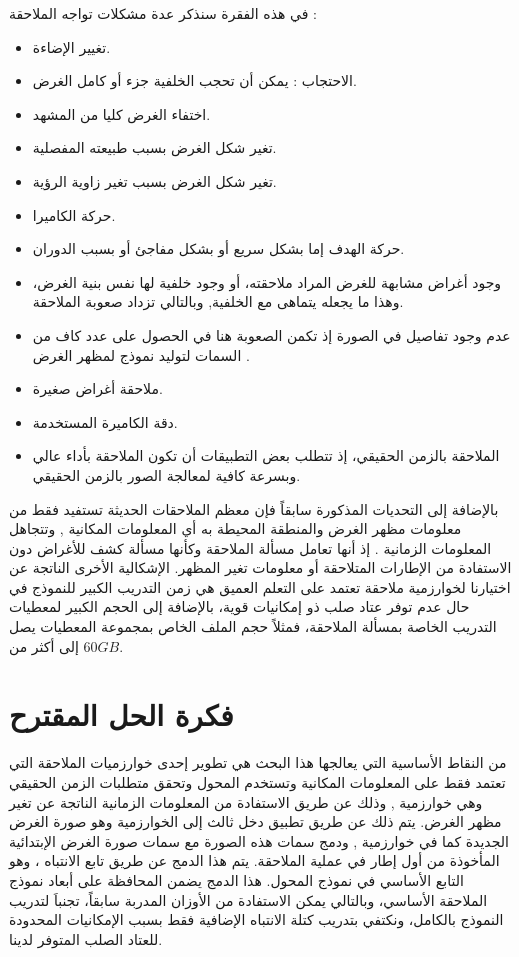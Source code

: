 في هذه الفقرة سنذكر عدة مشكلات تواجه الملاحقة :
\begin{itemize}
	\item
	تغيير الإضاءة.
	\item{الاحتجاب 
		: يمكن أن تحجب الخلفية جزء أو كامل الغرض.}
	\item
اختفاء الغرض كليا من المشهد.
	\item
تغير شكل الغرض بسبب طبيعته المفصلية.
	\item
تغير شكل الغرض بسبب تغير زاوية الرؤية.
	\item
حركة الكاميرا.
	\item{حركة الهدف إما بشكل سريع أو بشكل مفاجئ أو بسبب الدوران.}
	\item{وجود أغراض مشابهة للغرض المراد ملاحقته، أو وجود خلفية لها نفس بنية الغرض، وهذا ما يجعله يتماهى مع الخلفية, وبالتالي تزداد صعوبة الملاحقة.}
	\item{
		عدم وجود تفاصيل في الصورة إذ تكمن الصعوبة هنا في الحصول على عدد كاف من السمات لتوليد نموذج لمظهر الغرض 
		}.
	\item
	ملاحقة أغراض صغيرة.
	\item
	دقة الكاميرة المستخدمة.
	\item
		الملاحقة بالزمن الحقيقي، إذ تتطلب بعض التطبيقات أن تكون الملاحقة بأداء عالي وبسرعة كافية لمعالجة الصور بالزمن الحقيقي.
\end{itemize}
بالإضافة إلى التحديات المذكورة سابقاً فإن معظم الملاحقات الحديثة تستفيد فقط من معلومات مظهر الغرض والمنطقة المحيطة به أي المعلومات المكانية
,
وتتجاهل المعلومات الزمانية
.
إذ أنها تعامل مسألة الملاحقة وكأنها مسألة كشف للأغراض دون الاستفادة من الإطارات المتلاحقة أو معلومات تغير المظهر.
\newline
الإشكالية الأخرى الناتجة عن اختيارنا لخوارزمية ملاحقة تعتمد على  التعلم العميق هي زمن التدريب الكبير للنموذج في حال عدم توفر عتاد صلب ذو إمكانيات قوية، بالإضافة إلى الحجم الكبير لمعطيات التدريب الخاصة بمسألة الملاحقة، فمثلاً حجم الملف الخاص بمجموعة المعطيات 
يصل إلى أكثر من $60GB$.
\section{فكرة الحل المقترح}
من النقاط الأساسية التي يعالجها هذا البحث هي تطوير إحدى خوارزميات الملاحقة التي تعتمد فقط على المعلومات المكانية وتستخدم المحول وتحقق متطلبات الزمن الحقيقي وهي خوارزمية
,
وذلك عن طريق الاستفادة من المعلومات الزمانية الناتجة عن تغير مظهر الغرض.
يتم ذلك عن طريق تطبيق دخل ثالث إلى الخوارزمية وهو صورة الغرض الجديدة
كما في خوارزمية 
,
ودمج سمات هذه الصورة مع سمات صورة الغرض الإبتدائية المأخوذة من أول إطار في عملية الملاحقة.
يتم هذا الدمج عن طريق تابع الانتباه
،
وهو التابع الأساسي في نموذج المحول. هذا الدمج يضمن المحافظة على أبعاد نموذج الملاحقة الأساسي، وبالتالي يمكن الاستفادة من الأوزان المدربة سابقاً، تجنباَ لتدريب النموذج بالكامل، ونكتفي بتدريب كتلة الانتباه الإضافية فقط بسبب الإمكانيات المحدودة للعتاد الصلب المتوفر لدينا.
